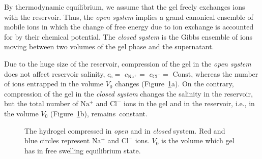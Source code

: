 \documentclass[gels,article,accept,pdftex,moreauthors]{Definitions/mdpi}
\newcommand{\ie}{{i.e.,} }
\newcommand{\cna}{c_\mathrm{Na^+}}
\newcommand{\ccl}{c_\mathrm{Cl^-}}
\newcommand{\cl}{\mathrm{Cl^-}}
\newcommand{\na}{\mathrm{Na^+}}
\newcommand{\cs}{c_{\mathrm{s}}}
\newcommand{\Vbox}{V_0}
\newcommand{\reffig}[1]{Figure~\ref{#1}}
\begin{document}
By thermodynamic equilibrium, we assume that the gel freely exchanges ions with the reservoir.
Thus, the \emph{open system} implies a grand canonical ensemble of mobile ions in which the change of free energy due to ion exchange is accounted for by their chemical potential.
The \emph{closed system} is the Gibbs ensemble of ions moving between two volumes of the gel phase and the supernatant.

Due to the huge size of the reservoir, compression of the gel in the \emph{open system} does not affect reservoir salinity, $\cs =$ $\cna=$ $\ccl=$ $\text{Const}$, whereas the number of ions entrapped in the volume $\Vbox$ changes (\reffig{fig:open and closed}a).
On the contrary, compression of the gel in the \emph{closed system} changes the salinity in the reservoir, but the total number of $\na$ and $\cl$ ions in the gel and in the reservoir, \ie in the volume $\Vbox$ (\reffig{fig:open and closed}b), remains~constant.
\begin{figure}[H]
	{\captionsetup{position=bottom,justification=centering}
	}
	
	\caption{The hydrogel compressed in \emph{open} and in \emph{closed} system.
		Red and blue circles represent $\na$ and $\cl$ ions. $V_0$ is the volume which gel has in free swelling equilibrium state.\label{fig:open and closed}}
\end{figure}
\end{document}
